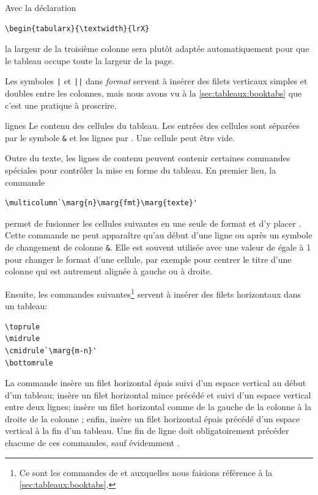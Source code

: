 \begin{list}{}
  Avec la déclaration
\begin{lstlisting}
\begin{tabularx}{\textwidth}{lrX}
\end{lstlisting}
  la largeur de la troisième colonne sera plutôt adaptée
  automatiquement pour que le tableau occupe toute la largeur de la
  page.

  Les symboles \verb=|= et \verb=||= dans \textit{format} servent à
  insérer des filets verticaux simples et doubles entre les colonnes,
  mais nous avons vu à la \autoref{sec:tableaux:booktabs} que c'est
  une pratique à proscrire.
\item[lignes] Le contenu des cellules du tableau. Les entrées des
  cellules sont séparées par le symbole \verb=&= et les lignes par
  {\pixbsbs}. Une cellule peut être vide.
\end{list}

Outre du texte, les lignes de contenu peuvent contenir certaines
commandes spéciales pour contrôler la mise en forme du tableau. En
premier lieu, la commande
\begin{lstlisting}
\multicolumn`\marg{n}\marg{fmt}\marg{texte}'
\end{lstlisting}
permet de fusionner les  cellules suivantes en une seule de
format  et d'y placer . Cette commande ne peut
apparaître qu'au début d'une ligne ou après un symbole de changement
de colonne \verb=&=. Elle est souvent utilisée avec une valeur de
 égale à 1 pour changer le format d'une cellule, par exemple
pour centrer le titre d'une colonne qui est autrement alignée à gauche
ou à droite.

Ensuite, les commandes suivantes\footnote{%
  Ce sont les commandes de  et  auxquelles
  nous faisions référence à la \autoref{sec:tableaux:booktabs}.} %
servent à insérer des filets horizontaux dans un tableau:
\begin{lstlisting}
\toprule
\midrule
\cmidrule`\marg{m-n}'
\bottomrule
\end{lstlisting}
La commande \cmd{\toprule} insère un filet horizontal épais suivi d'un
espace vertical au début d'un tableau; \cmd{\midrule} insère un filet
horizontal mince précédé et suivi d'un espace vertical entre deux
lignes; \cmd{\cmidrule} insère un filet horizontal comme
\cmdprint{\midrule} de la gauche de la colonne  à la droite de
la colonne ; enfin, \cmd{\bottomrule} insère un filet
horizontal épais précédé d'un espace vertical à la fin d'un tableau.
Une fin de ligne {\bs\bs} doit obligatoirement précéder chacune de ces
commandes, sauf évidemment \cmdprint{\toprule}.

